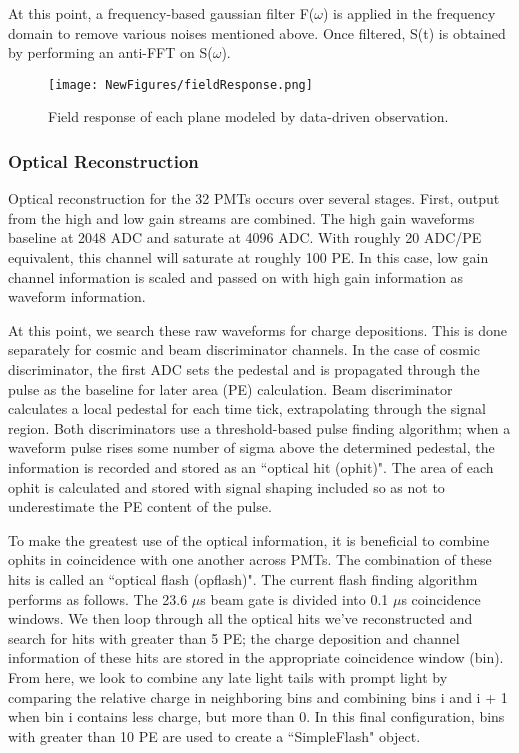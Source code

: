 \documentclass[12pt]{article}
\begin{document}
At this point, a frequency-based gaussian filter F($\omega$) is applied in the frequency domain to remove various noises mentioned above. Once filtered, S(t) is obtained by performing an anti-FFT on S($\omega$). 


\begin{figure}[h!]
\centering
\texttt{[image: NewFigures/fieldResponse.png]}
\caption{Field response of each plane modeled by data-driven observation. }
\label{fig:fieldResponse}
\end{figure}


\subsubsection{Optical Reconstruction} 
Optical reconstruction for the 32 PMTs occurs over several stages. First, output from the high and low gain streams are combined.  The high gain waveforms baseline at 2048 ADC and saturate at 4096 ADC.  With roughly 20 ADC/PE equivalent, this channel will saturate at roughly 100 PE.  In this case, low gain channel information is scaled and passed on with high gain information as waveform information. 
\par At this point, we search these raw waveforms for charge depositions.  This is done separately for cosmic and beam discriminator channels. In the case of cosmic discriminator, the first ADC sets the pedestal and is propagated through the pulse as the baseline for later area (PE) calculation. Beam discriminator calculates a local pedestal for each time tick, extrapolating through the signal region. Both discriminators use a threshold-based pulse finding algorithm; when a waveform pulse rises some number of sigma above the determined pedestal, the information is recorded and stored as an ``optical hit (ophit)".  The area of each ophit is calculated and stored with signal shaping included so as not to underestimate the PE content of the pulse.
\par To make the greatest use of the optical information, it is beneficial to combine ophits in coincidence with one another across PMTs.  The combination of these hits is called an ``optical flash (opflash)".  The current flash finding algorithm performs as follows. The 23.6 $\mu$s beam gate is divided into 0.1 $\mu$s coincidence windows. We then loop through all the optical hits we've reconstructed and search for hits with greater than 5 PE; the charge deposition and channel information of these hits are stored in the appropriate coincidence window (bin).  From here, we look to combine any late light tails with prompt light by comparing the relative charge in neighboring bins and combining bins i and i + 1 when bin i contains less charge, but more than 0.  In this final configuration, bins with greater than 10 PE are used to create a ``SimpleFlash" object.
\end{document}
